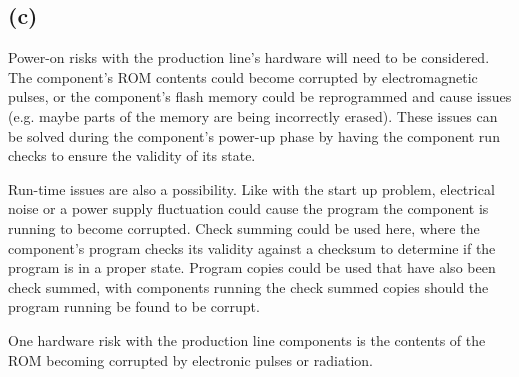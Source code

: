 \documentclass[]{report}
\begin{document}
			
			\subsection{(c)}
			Power-on risks with the production line's hardware will need to be considered. The component's ROM contents could become corrupted by electromagnetic pulses, or the component's flash memory could be reprogrammed and cause issues (e.g. maybe parts of the memory are being incorrectly erased). These issues can be solved during the component's power-up phase by having the component run checks to ensure the validity of its state.
			
			Run-time issues are also a possibility. Like with the start up problem, electrical noise or a power supply fluctuation could cause the program the component is running to become corrupted. Check summing could be used here, where the component's program checks its validity against a checksum to determine if the program is in a proper state. Program copies could be used that have also been check summed, with components running the check summed copies should the program running be found to be corrupt.
			
			One hardware risk with the production line components is the contents of the ROM becoming corrupted by electronic pulses or radiation.


	
	
\end{document}
